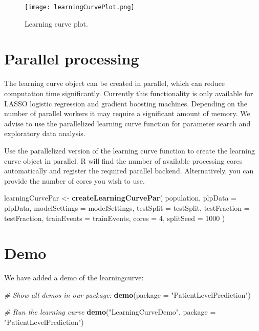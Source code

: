 \documentclass[
]{article}
\newenvironment{Shaded}{\begin{snugshade}}{\end{snugshade}}
\newcommand{\CommentTok}[1]{\textcolor[rgb]{0.56,0.35,0.01}{\textit{#1}}}
\newcommand{\DataTypeTok}[1]{\textcolor[rgb]{0.13,0.29,0.53}{#1}}
\newcommand{\DecValTok}[1]{\textcolor[rgb]{0.00,0.00,0.81}{#1}}
\newcommand{\KeywordTok}[1]{\textcolor[rgb]{0.13,0.29,0.53}{\textbf{#1}}}
\newcommand{\NormalTok}[1]{#1}
\newcommand{\StringTok}[1]{\textcolor[rgb]{0.31,0.60,0.02}{#1}}
\begin{document}
\begin{figure}
\centering
\texttt{[image: learningCurvePlot.png]}
\caption{Learning curve plot.}
\end{figure}

\hypertarget{parallel-processing}{%
\section{Parallel processing}\label{parallel-processing}}

The learning curve object can be created in parallel, which can reduce
computation time significantly. Currently this functionality is only
available for LASSO logistic regression and gradient boosting machines.
Depending on the number of parallel workers it may require a significant
amount of memory. We advise to use the parallelized learning curve
function for parameter search and exploratory data analysis.

Use the parallelized version of the learning curve function to create
the learning curve object in parallel. R will find the number of
available processing cores automatically and register the required
parallel backend. Alternatively, you can provide the number of cores you
wish to use.

\begin{Shaded}
\begin{Highlighting}[]
\NormalTok{learningCurvePar <-}\StringTok{ }\KeywordTok{createLearningCurvePar}\NormalTok{(}
\NormalTok{  population,}
  \DataTypeTok{plpData =}\NormalTok{  plpData,}
  \DataTypeTok{modelSettings =}\NormalTok{ modelSettings,}
  \DataTypeTok{testSplit =}\NormalTok{ testSplit,}
  \DataTypeTok{testFraction =}\NormalTok{ testFraction,}
  \DataTypeTok{trainEvents =}\NormalTok{ trainEvents,}
  \DataTypeTok{cores =} \DecValTok{4}\NormalTok{,}
  \DataTypeTok{splitSeed =} \DecValTok{1000}
\NormalTok{)}
\end{Highlighting}
\end{Shaded}

\hypertarget{demo}{%
\section{Demo}\label{demo}}

We have added a demo of the learningcurve:

\begin{Shaded}
\begin{Highlighting}[]
\CommentTok{# Show all demos in our package: }
 \KeywordTok{demo}\NormalTok{(}\DataTypeTok{package =} \StringTok{"PatientLevelPrediction"}\NormalTok{)}

\CommentTok{# Run the learning curve}
 \KeywordTok{demo}\NormalTok{(}\StringTok{"LearningCurveDemo"}\NormalTok{, }\DataTypeTok{package =} \StringTok{"PatientLevelPrediction"}\NormalTok{)}
\end{Highlighting}
\end{Shaded}
\end{document}
